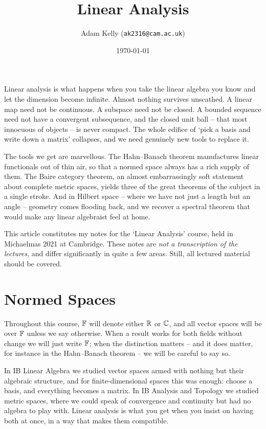 \documentclass[a4paper]{scrartcl}
\title{Linear Analysis}
\author{Adam Kelly (\texttt{ak2316@cam.ac.uk})}
\date{\today}
\begin{document}
\maketitle

Linear analysis is what happens when you take the linear algebra you know and let the dimension become infinite. Almost nothing survives unscathed. A linear map need not be continuous. A subspace need not be closed. A bounded sequence need not have a convergent subsequence, and the closed unit ball -- that most innocuous of objects -- is never compact. The whole edifice of `pick a basis and write down a matrix' collapses, and we need genuinely new tools to replace it.

The tools we get are marvellous. The Hahn--Banach theorem manufactures linear functionals out of thin air, so that a normed space always has a rich supply of them. The Baire category theorem, an almost embarrassingly soft statement about complete metric spaces, yields three of the great theorems of the subject in a single stroke. And in Hilbert space -- where we have not just a length but an angle -- geometry comes flooding back, and we recover a spectral theorem that would make any linear algebraist feel at home.

This article constitutes my notes for the `Linear Analysis' course, held in Michaelmas 2021 at Cambridge. These notes are \emph{not a transcription of the lectures}, and differ significantly in quite a few areas. Still, all lectured material should be covered.

\tableofcontents

\section{Normed Spaces}

Throughout this course, $\mathbb{F}$ will denote either $\mathbb{R}$ or $\mathbb{C}$, and all vector spaces will be over $\mathbb{F}$ unless we say otherwise. When a result works for both fields without change we will just write $\mathbb{F}$; when the distinction matters -- and it does matter, for instance in the Hahn--Banach theorem -- we will be careful to say so.

In IB Linear Algebra we studied vector spaces armed with nothing but their algebraic structure, and for finite-dimensional spaces this was enough: choose a basis, and everything becomes a matrix. In IB Analysis and Topology we studied metric spaces, where we could speak of convergence and continuity but had no algebra to play with. Linear analysis is what you get when you insist on having both at once, in a way that makes them compatible.
\end{document}
